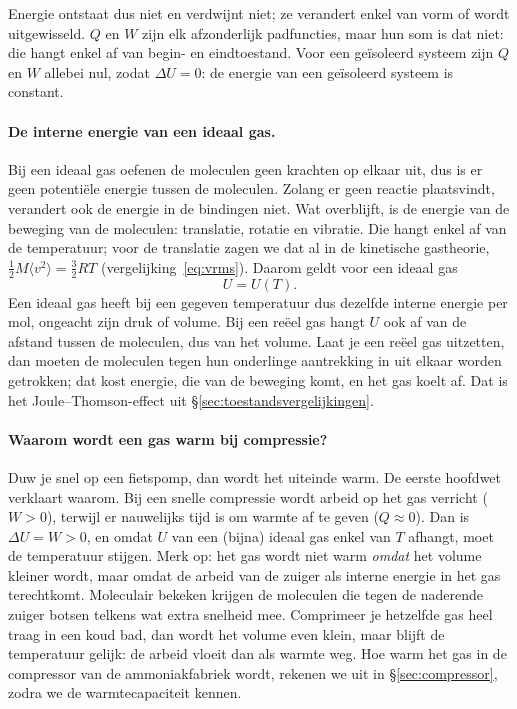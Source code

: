 Energie ontstaat dus niet en verdwijnt niet; ze verandert enkel van vorm of wordt uitgewisseld. $Q$ en $W$ zijn elk afzonderlijk padfuncties, maar hun som is dat niet: die hangt enkel af van begin- en eindtoestand. Voor een ge\"isoleerd systeem zijn $Q$ en $W$ allebei nul, zodat $\Delta U = 0$: de energie van een ge\"isoleerd systeem is constant.

\paragraph{De interne energie van een ideaal gas.} Bij een ideaal gas oefenen de moleculen geen krachten op elkaar uit, dus is er geen potenti\"ele energie tussen de moleculen. Zolang er geen reactie plaatsvindt, verandert ook de energie in de bindingen niet. Wat overblijft, is de energie van de beweging van de moleculen: translatie, rotatie en vibratie. Die hangt enkel af van de temperatuur; voor de translatie zagen we dat al in de kinetische gastheorie, $\tfrac12 M\langle v^2\rangle = \tfrac32 RT$ (vergelijking~\eqref{eq:vrms}). Daarom geldt voor een ideaal gas
\[
U = U(T).
\]
Een ideaal gas heeft bij een gegeven temperatuur dus dezelfde interne energie per mol, ongeacht zijn druk of volume. Bij een re\"eel gas hangt $U$ ook af van de afstand tussen de moleculen, dus van het volume. Laat je een re\"eel gas uitzetten, dan moeten de moleculen tegen hun onderlinge aantrekking in uit elkaar worden getrokken; dat kost energie, die van de beweging komt, en het gas koelt af. Dat is het Joule--Thomson-effect uit \S\ref{sec:toestandsvergelijkingen}.

\paragraph{Waarom wordt een gas warm bij compressie?} Duw je snel op een fietspomp, dan wordt het uiteinde warm. De eerste hoofdwet verklaart waarom. Bij een snelle compressie wordt arbeid op het gas verricht ($W > 0$), terwijl er nauwelijks tijd is om warmte af te geven ($Q \approx 0$). Dan is $\Delta U = W > 0$, en omdat $U$ van een (bijna) ideaal gas enkel van $T$ afhangt, moet de temperatuur stijgen. Merk op: het gas wordt niet warm \emph{omdat} het volume kleiner wordt, maar omdat de arbeid van de zuiger als interne energie in het gas terechtkomt. Moleculair bekeken krijgen de moleculen die tegen de naderende zuiger botsen telkens wat extra snelheid mee. Comprimeer je hetzelfde gas heel traag in een koud bad, dan wordt het volume even klein, maar blijft de temperatuur gelijk: de arbeid vloeit dan als warmte weg. Hoe warm het gas in de compressor van de ammoniakfabriek wordt, rekenen we uit in \S\ref{sec:compressor}, zodra we de warmtecapaciteit kennen.

